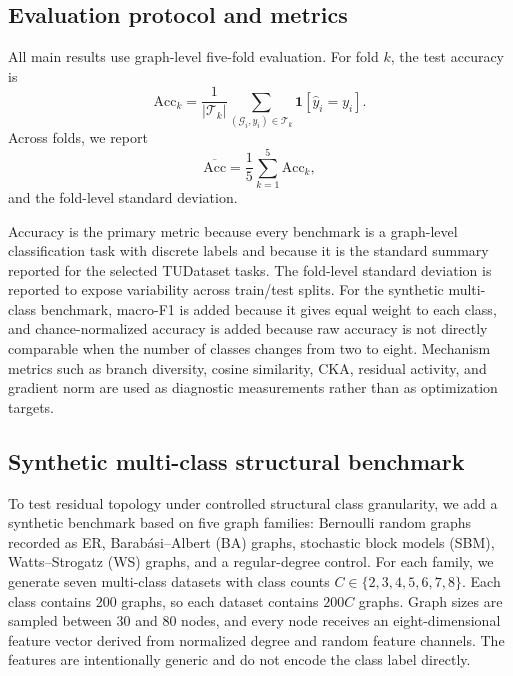 \subsection{Evaluation protocol and metrics}

All main results use graph-level five-fold evaluation. For fold \(k\), the test accuracy is
\begin{equation}
\mathrm{Acc}_{k}=
\frac{1}{|\mathcal{T}_{k}|}
\sum_{(\mathcal{G}_{i},y_{i})\in\mathcal{T}_{k}}
\mathbf{1}[\hat{y}_{i}=y_{i}].
\end{equation}
Across folds, we report
\begin{equation}
\overline{\mathrm{Acc}}=\frac{1}{5}\sum_{k=1}^{5}\mathrm{Acc}_{k},
\end{equation}
and the fold-level standard deviation.

Accuracy is the primary metric because every benchmark is a graph-level classification task with discrete labels and because it is the standard summary reported for the selected TUDataset tasks. The fold-level standard deviation is reported to expose variability across train/test splits. For the synthetic multi-class benchmark, macro-F1 is added because it gives equal weight to each class, and chance-normalized accuracy is added because raw accuracy is not directly comparable when the number of classes changes from two to eight. Mechanism metrics such as branch diversity, cosine similarity, CKA, residual activity, and gradient norm are used as diagnostic measurements rather than as optimization targets.

\subsection{Synthetic multi-class structural benchmark}
\label{sec:synthetic}

To test residual topology under controlled structural class granularity, we add a synthetic benchmark based on five graph families: Bernoulli random graphs recorded as ER, Barabási--Albert (BA) graphs, stochastic block models (SBM), Watts--Strogatz (WS) graphs, and a regular-degree control. For each family, we generate seven multi-class datasets with class counts \(C\in\{2,3,4,5,6,7,8\}\). Each class contains 200 graphs, so each dataset contains \(200C\) graphs. Graph sizes are sampled between 30 and 80 nodes, and every node receives an eight-dimensional feature vector derived from normalized degree and random feature channels. The features are intentionally generic and do not encode the class label directly.

